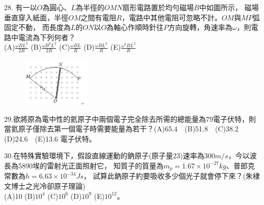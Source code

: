 \documentclass[cn,10pt,math=newtx,chinesefont=founder,device=ig]{elegantbook}
\begin{document}
\begin{example}
   28. 有一以$O$為圓心、$L$為半徑的$OMN$扇形電路置於均勻磁場$B$中如圖所示，
   磁場垂直穿入紙面，半徑$OM$之間有電阻$R$，電路中其他電阻可忽略不計。$OM$與$MP$弧固定不動，
   而長度為$L$的$ON$以$O$為軸心作順時針往$P$方向旋轉，角速率為$\omega$，則電路中電流為下列何者？\\
   (A)$\frac{\omega BL^2}{2R}$ (B)$\frac{\omega B^2 L^2}{2R}$ 
   (C)$\frac{\omega BL}{R}$ (D)$\frac{\omega BL^2}{R}$ (E)$\frac{\omega^2 BL^2}{R}$
   \\
    \rightline{[成德高中教甄109]}
\end{example}
\begin{solution}
    
\end{solution}
\begin{figure}[htbp]
    \flushright
    \includegraphics[width=0.3\textwidth]{image/109成德28.png}
  \end{figure}
\newpage


\begin{example}
   29.欲將原為電中性的氦原子中兩個電子完全除去所需的總能量為79電子伏特，則當氦原子僅除去第一個電子時需要能量為若干？(A)65.4　(B)51.8　(C)38.2　(D)24.6　(E)13.6 電子伏特。\\
    \rightline{[成德高中教甄109]}
\end{example}
\begin{solution}
    
\end{solution}

\newpage


\begin{example}
  30.在特殊實驗環境下，假設直線運動的鈉原子(原子量23)速率為$300m/s$，今以波長為5890埃的雷射光正面照射它，
  知質子的質量為$m_p=1.67 \times 10^{-27} kg$、普郎克常數為$h= 6.63 \times 10^{-34} Js$，
  試算此鈉原子約要吸收多少個光子就會停下來？(朱棣文博士之光冷卻原子理論)\\
  (A)10 (B)$10^4$ (C)$10^6$ (D)$10^9$ (E)$10^12$。 \\
    \rightline{[成德高中教甄109]}
\end{example}
\begin{solution}
    
\end{solution}
\end{document}

